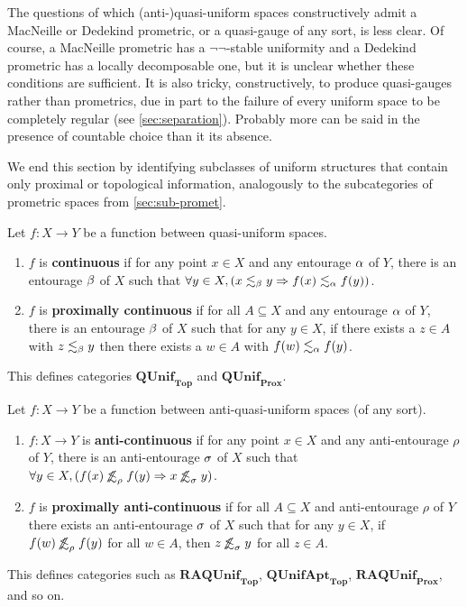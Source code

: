 \documentclass{article}
\def\oapt{\mathrel{\!\not\,\not\lesssim}}
\def\leapx{\lesssim}
\def\ent#1{\leapx_{#1}}
\def\aent#1{\oapt_{#1}}
\let\implies\Rightarrow
\def\nn{\ensuremath{\neg\neg}}
\def\QUnifTop{\mathbf{QUnif}_{\mathbf{Top}}}
\def\QUnifProx{\mathbf{QUnif}_{\mathbf{Prox}}}
\def\RAQUnifTop{\mathbf{RAQUnif}_{\mathbf{Top}}}
\def\RAQUnifProx{\mathbf{RAQUnif}_{\mathbf{Prox}}}
\def\QUnifAptTop{\mathbf{QUnifApt}_{\mathbf{Top}}}
\begin{document}
The questions of which (anti-)quasi-uniform spaces constructively admit a MacNeille or Dedekind prometric, or a quasi-gauge of any sort, is less clear.
Of course, a MacNeille prometric has a \nn-stable uniformity and a Dedekind prometric has a locally decomposable one, but it is unclear whether these conditions are sufficient.
It is also tricky, constructively, to produce quasi-gauges rather than prometrics, due in part to the failure of every uniform space to be completely regular (see \cref{sec:separation}).
Probably more can be said in the presence of countable choice than it its absence.

We end this section by identifying subclasses of uniform structures that contain only proximal or topological information, analogously to the subcategories of prometric spaces from \cref{sec:sub-promet}.

\begin{defn}
  Let $f:X\to Y$ be a function between quasi-uniform spaces.
  \begin{enumerate}
  \item $f$ is \textbf{continuous} if for any point $x\in X$ and any entourage $\alpha$ of $Y$, there is an entourage $\beta$ of $X$ such that $\forall y\in X, (x\ent\be y\implies f(x) \ent\al f(y))$.
  \item $f$ is \textbf{proximally continuous} if for all $A\subseteq X$ and any entourage $\alpha$ of $Y$, there is an entourage $\beta$ of $X$ such that for any $y\in X$, if there exists a $z\in A$ with $z\ent\be y$ then there exists a $w\in A$ with $f(w) \ent\al f(y)$.
  \end{enumerate}
  This defines categories $\QUnifTop$ and $\QUnifProx$.
\end{defn}

\begin{defn}
  Let $f:X\to Y$ be a function between anti-quasi-uniform spaces (of any sort).
  \begin{enumerate}
  \item $f:X\to Y$ is \textbf{anti-continuous} if for any point $x\in X$ and any anti-entourage $\rho$ of $Y$, there is an anti-entourage $\sigma$ of $X$ such that $\forall y\in X, (f(x)\aent\rho f(y) \implies x\aent\si y)$.
  \item $f$ is \textbf{proximally anti-continuous} if for all $A\subseteq X$ and anti-entourage $\rho$ of $Y$ there exists an anti-entourage $\sigma$ of $X$ such that for any $y\in X$, if $f(w) \aent\rho f(y)$ for all $w\in A$, then $z \aent\si y$ for all $z\in A$.
  \end{enumerate}
  This defines categories such as $\RAQUnifTop$, $\QUnifAptTop$, $\RAQUnifProx$, and so on.
\end{defn}
\end{document}
